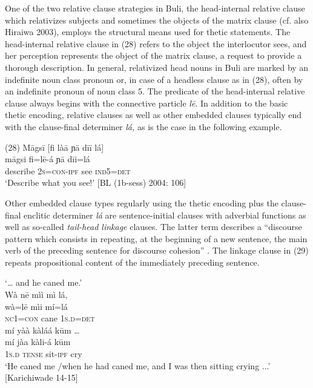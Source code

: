 \documentclass[output=paper]{langsci/langscibook}
\begin{document}
One of the two relative clause strategies in Buli, the head-internal relative clause which relativizes subjects and sometimes the objects of the matrix clause (cf. also Hiraiwa 2003), employs the structural means used for thetic statements. The head-internal relative clause in (28) refers to the object the interlocutor sees, and her perception represents the object of the matrix clause, a request to provide a thorough description. In general, relativized head nouns in Buli are marked by an indefinite noun class pronoun or, in case of a headless clause as in (28), often by an indefinite pronoun of noun class 5. The predicate of the head-internal relative clause always begins with the connective particle \textit{l\={e}}. In addition to the basic thetic encoding, relative clauses as well as other embedded clauses typically end with the clause-final determiner \textit{lá, }as is the case in the following example.

\ea
\glll \textup{(28)}  M\={a}gs\={i}    \textup{[}fi là\={a}     ɲ\={a}  d\={i}\={i}   lá\textup{]}\\
  \textup{  m\={a}gsi    fi=l\={e}-á     ɲ\={a}  d\={i}i=lá}\\
       describe    2\textsc{s}=\textsc{con}{}-\textsc{ipf}   see     \textsc{ind}5=\textsc{det}\\
\glt ‘Describe what you see!’ [BL (1b-sess) 2004: 106]
\z

Other embedded clause types regularly using the thetic encoding plus the clause-final enclitic determiner \textit{lá} are sentence-initial clauses with adverbial functions as well as so-called \textit{tail-head linkage} clauses. The latter term describes a “discourse pattern which consists in repeating, at the beginning of a new sentence, the main verb of the preceding sentence for discourse cohesion” \citep[109]{Guillaume2011}. The linkage clause in (29) repeats propositional content of the immediately preceding sentence. 

\ea
‘… and he caned me.’\\
\glll   Wà  n\={e}  mìì  mì   lá,\\
  \textup{  wà=l\={e}  mìi  mí=lá}\\
     \textsc{  nc}1=\textsc{con}\textsubscript{  }cane  1\textsc{s}.\textsc{d}=\textsc{det}\\
\glll   mí    yàà  kàláá    k\={u}m …\\
  \textup{  mí    jàa  kàli-á    k\={u}m}\\
       1\textsc{s}.\textsc{d}  \textsc{tense}  sit-\textsc{ipf}    cry\\
\glt ‘He caned me /when he had caned me, and I was then sitting crying ...’ [Karichiwade 14-15]
\z
\end{document}
